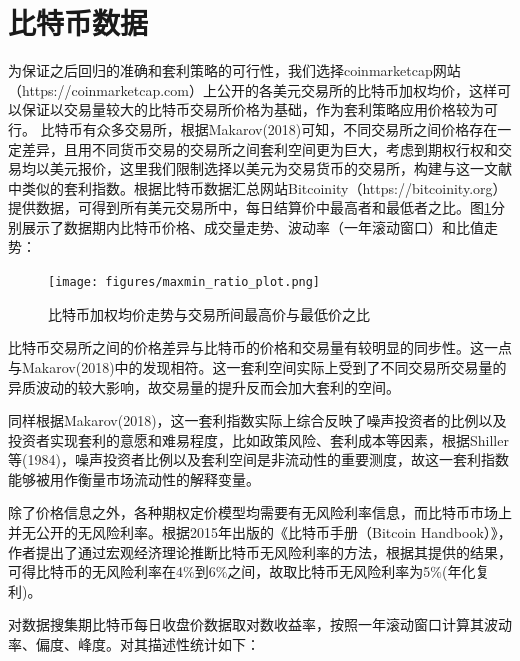 \section{比特币数据}

\par{为保证之后回归的准确和套利策略的可行性，我们选择coinmarketcap网站（https://coinmarketcap.com）上公开的各美元交易所的比特币加权均价，这样可以保证以交易量较大的比特币交易所价格为基础，作为套利策略应用价格较为可行。
比特币有众多交易所，根据Makarov(2018)可知，不同交易所之间价格存在一定差异，且用不同货币交易的交易所之间套利空间更为巨大\cite{Makarov-2018}，考虑到期权行权和交易均以美元报价，这里我们限制选择以美元为交易货币的交易所，构建与这一文献中类似的套利指数。根据比特币数据汇总网站Bitcoinity（https://bitcoinity.org）提供数据，可得到所有美元交易所中，每日结算价中最高者和最低者之比。图\ref{maxmin_ratio}分别展示了数据期内比特币价格、成交量走势、波动率（一年滚动窗口）和比值走势：
\begin{figure}[H]
\begin{small}
    \begin{center}
        \texttt{[image: figures/maxmin\_ratio\_plot.png]} 
    \end{center}
    \caption{比特币加权均价走势与交易所间最高价与最低价之比}
    \label{maxmin_ratio}
\end{small}
\end{figure}
}
\par{比特币交易所之间的价格差异与比特币的价格和交易量有较明显的同步性。这一点与Makarov(2018)中的发现相符\cite{Makarov-2018}。这一套利空间实际上受到了不同交易所交易量的异质波动的较大影响，故交易量的提升反而会加大套利的空间。}
\par{同样根据Makarov(2018)，这一套利指数实际上综合反映了噪声投资者的比例以及投资者实现套利的意愿和难易程度，比如政策风险、套利成本等因素，根据Shiller等(1984)，噪声投资者比例以及套利空间是非流动性的重要测度，故这一套利指数能够被用作衡量市场流动性的解释变量。}

\par{除了价格信息之外，各种期权定价模型均需要有无风险利率信息，而比特币市场上并无公开的无风险利率。根据2015年出版的《比特币手册（Bitcoin Handbook）》\cite{WESNER2015223}，作者提出了通过宏观经济理论推断比特币无风险利率的方法，根据其提供的结果，可得比特币的无风险利率在4$\%$到6$\%$之间，故取比特币无风险利率为5$\%$(年化复利)。
}


\par{
对数据搜集期比特币每日收盘价数据取对数收益率，按照一年滚动窗口计算其波动率、偏度、峰度。对其描述性统计如下：}

